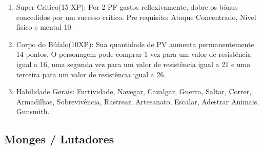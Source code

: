 \begin{enumerate}
  	\item Super Critico(15 XP): Por 2 PF gastos reflexivamente, dobre os bônus concedidos por um sucesso critico. Pre requisito: Ataque Concentrado, Nivel físico e mental 10.

    \item Corpo do Búfalo(10XP): Sua quantidade de PV aumenta permanentemente 14 pontos. O personagem pode comprar 1 vez para um valor de resistência igual a 16, uma segunda vez para um valor de resistência igual a 21 e uma terceira para um valor de resistência igual a 26.

		
\item Habilidade Gerais: Furtividade, Navegar, Cavalgar, Guerra, Saltar, Correr, Armadilhas, Sobrevivência, Rastrear, Artesanato, Escalar, Adestrar Animais, Gunsmith.
\end{enumerate}
 

\subsection{Monges / Lutadores} 
    
